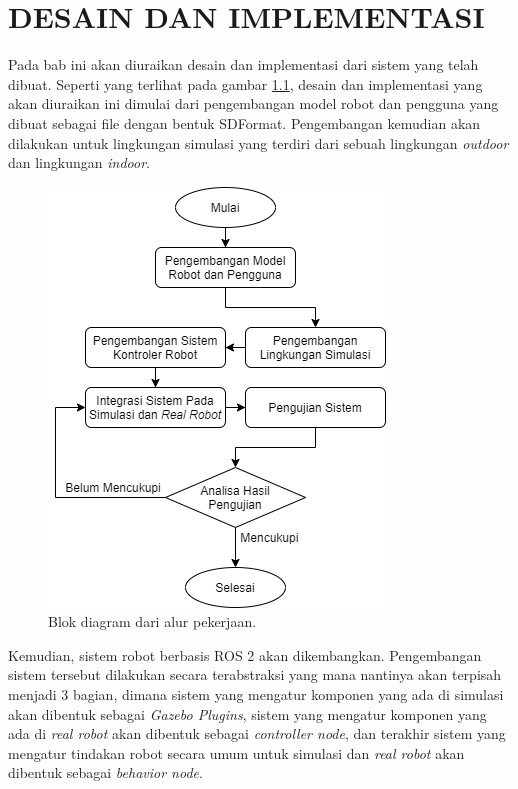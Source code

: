\chapter{DESAIN DAN IMPLEMENTASI}
\label{chap:desainimplementasi}

Pada bab ini akan diuraikan desain dan implementasi dari sistem yang telah dibuat.
Seperti yang terlihat pada gambar \ref{fig:blogdiagramkerja},
  desain dan implementasi yang akan diuraikan ini dimulai dari pengembangan model robot dan pengguna yang dibuat sebagai file dengan bentuk SDFormat.
Pengembangan kemudian akan dilakukan untuk lingkungan simulasi yang terdiri dari sebuah lingkungan \emph{outdoor} dan lingkungan \emph{indoor}.

\begin{figure}[ht]
  \centering
  \includegraphics[scale=0.6]{gambar/blok-diagram-kerja.png}
  \caption{Blok diagram dari alur pekerjaan.}
  \label{fig:blogdiagramkerja}
\end{figure}

Kemudian, sistem robot berbasis ROS 2 akan dikembangkan.
Pengembangan sistem tersebut dilakukan secara terabstraksi yang mana nantinya akan terpisah menjadi 3 bagian,
  dimana sistem yang mengatur komponen yang ada di simulasi akan dibentuk sebagai \emph{Gazebo Plugins},
  sistem yang mengatur komponen yang ada di \emph{real robot} akan dibentuk sebagai \emph{controller node},
  dan terakhir sistem yang mengatur tindakan robot secara umum untuk simulasi dan \emph{real robot} akan dibentuk sebagai \emph{behavior node}.

